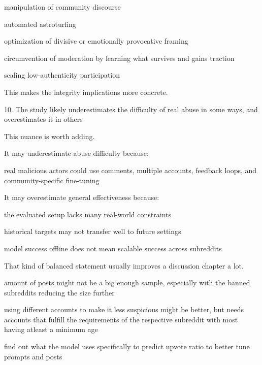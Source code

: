 manipulation of community discourse

automated astroturfing

optimization of divisive or emotionally provocative framing

circumvention of moderation by learning what survives and gains traction

scaling low-authenticity participation

This makes the integrity implications more concrete.


10. The study likely underestimates the difficulty of real abuse in some ways, and overestimates it in others

This nuance is worth adding.

It may underestimate abuse difficulty because:

real malicious actors could use comments, multiple accounts, feedback loops, and community-specific fine-tuning

It may overestimate general effectiveness because:

the evaluated setup lacks many real-world constraints

historical targets may not transfer well to future settings

model success offline does not mean scalable success across subreddits

That kind of balanced statement usually improves a discussion chapter a lot.


amount of posts might not be a big enough sample, especially with the banned subreddits reducing the size further

using different accounts to make it less suspicious might be better, but needs accounts that fulfill the requirements of the respective subreddit with most having atleast a minimum age

find out what the model uses specifically to predict upvote ratio to better tune prompts and posts
